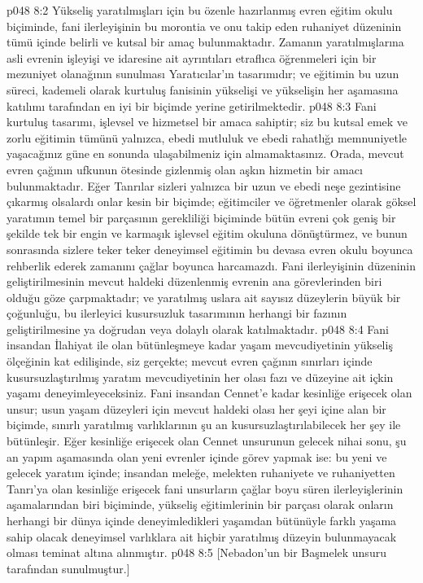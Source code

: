 \vs p048 8:2 Yükseliş yaratılmışları için bu özenle hazırlanmış evren eğitim okulu biçiminde, fani ilerleyişinin bu morontia ve onu takip eden ruhaniyet düzeninin tümü içinde belirli ve kutsal bir amaç bulunmaktadır. Zamanın yaratılmışlarına asli evrenin işleyişi ve idaresine ait ayrıntıları etraflıca öğrenmeleri için bir mezuniyet olanağının sunulması Yaratıcılar’ın tasarımıdır; ve eğitimin bu uzun süreci, kademeli olarak kurtuluş fanisinin yükselişi ve yükselişin her aşamasına katılımı tarafından en iyi bir biçimde yerine getirilmektedir.
\vs p048 8:3 Fani kurtuluş tasarımı, işlevsel ve hizmetsel bir amaca sahiptir; siz bu kutsal emek ve zorlu eğitimin tümünü yalnızca, ebedi mutluluk ve ebedi rahatlığı memnuniyetle yaşacağınız güne en sonunda ulaşabilmeniz için almamaktasınız. Orada, mevcut evren çağının ufkunun ötesinde gizlenmiş olan aşkın hizmetin bir amacı bulunmaktadır. Eğer Tanrılar sizleri yalnızca bir uzun ve ebedi neşe gezintisine çıkarmış olsalardı onlar kesin bir biçimde; eğitimciler ve öğretmenler olarak göksel yaratımın temel bir parçasının gerekliliği biçiminde bütün evreni çok geniş bir şekilde tek bir engin ve karmaşık işlevsel eğitim okuluna dönüştürmez, ve bunun sonrasında sizlere teker teker deneyimsel eğitimin bu devasa evren okulu boyunca rehberlik ederek zamanını çağlar boyunca harcamazdı. Fani ilerleyişinin düzeninin geliştirilmesinin mevcut haldeki düzenlenmiş evrenin ana görevlerinden biri olduğu göze çarpmaktadır; ve yaratılmış uslara ait sayısız düzeylerin büyük bir çoğunluğu, bu ilerleyici kusursuzluk tasarımının herhangi bir fazının geliştirilmesine ya doğrudan veya dolaylı olarak katılmaktadır.
\vs p048 8:4 Fani insandan İlahiyat ile olan bütünleşmeye kadar yaşam mevcudiyetinin yükseliş ölçeğinin kat edilişinde, siz gerçekte; mevcut evren çağının sınırları içinde kusursuzlaştırılmış yaratım mevcudiyetinin her olası fazı ve düzeyine ait içkin yaşamı deneyimleyeceksiniz. Fani insandan Cennet’e kadar kesinliğe erişecek olan unsur; usun yaşam düzeyleri için mevcut haldeki olası her şeyi içine alan bir biçimde, sınırlı yaratılmış varlıklarının şu an kusursuzlaştırılabilecek her şey ile bütünleşir. Eğer kesinliğe erişecek olan Cennet unsurunun gelecek nihai sonu, şu an yapım aşamasında olan yeni evrenler içinde görev yapmak ise: bu yeni ve gelecek yaratım içinde; insandan meleğe, melekten ruhaniyete ve ruhaniyetten Tanrı’ya olan kesinliğe erişecek fani unsurların çağlar boyu süren ilerleyişlerinin aşamalarından biri biçiminde, yükseliş eğitimlerinin bir parçası olarak onların herhangi bir dünya içinde deneyimledikleri yaşamdan bütünüyle farklı yaşama sahip olacak deneyimsel varlıklara ait hiçbir yaratılmış düzeyin bulunmayacak olması teminat altına alınmıştır.
\vs p048 8:5 [Nebadon’un bir Başmelek unsuru tarafından sunulmuştur.]
